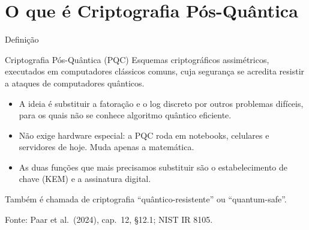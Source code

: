 \documentclass{beamer}
\begin{document}
\section{O que é Criptografia Pós-Quântica}

\begin{frame}{Definição}
    \begin{block}{Criptografia Pós-Quântica (PQC)}
        \footnotesize
        Esquemas criptográficos assimétricos, executados em computadores clássicos comuns, cuja segurança se acredita resistir a ataques de computadores quânticos.
    \end{block}
    \medskip
    \begin{itemize}
        \footnotesize
        \item A ideia é substituir a fatoração e o log discreto por outros problemas difíceis, para os quais não se conhece algoritmo quântico eficiente.
        \item Não exige hardware especial: a PQC roda em notebooks, celulares e servidores de hoje. Muda apenas a matemática.
        \item As duas funções que mais precisamos substituir são o estabelecimento de chave (KEM) e a assinatura digital.
    \end{itemize}
    \medskip
    \begin{tcolorbox}[colback=gray!8,colframe=gray!60!black,boxrule=0.5pt]
        \footnotesize
        Também é chamada de criptografia ``quântico-resistente'' ou ``quantum-safe''.
    \end{tcolorbox}
    \smallskip
    {\tiny Fonte: Paar et al.\ (2024), cap.\ 12, §12.1; NIST IR 8105.}
\end{frame}
\end{document}
